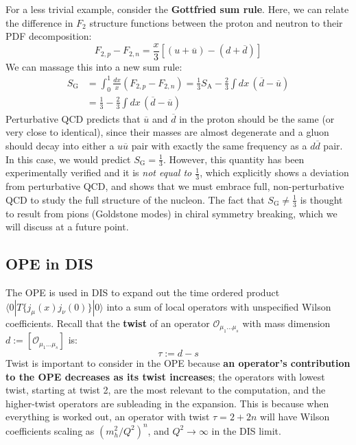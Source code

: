 \documentclass[11pt, oneside]{article}   	%
\theoremstyle{definition}
\begin{document}
For a less trivial example, consider the \textbf{Gottfried sum rule}. Here, we can relate the difference in $F_2$ structure functions between 
the proton and neutron to their PDF decomposition:
\begin{equation}
	F_{2, p} - F_{2, n} = \frac{x}{3}\left[(u + \overline u) - (d + \overline d)\right]
\end{equation}
We can massage this into a new sum rule:
\begin{align}
	S_\mathrm{G} &= \int_0^1\frac{dx}{x}(F_{2, p} - F_{2, n}) = \frac{1}{3} S_\mathrm{A} - \frac{2}{3} \int dx\, (\overline d - \overline u) \\
	&= \frac{1}{3} - \frac{2}{3}\int dx\,(\overline d - \overline u)
\end{align}
Perturbative QCD predicts that $\overline u$ and $\overline d$ in the proton should be the same (or very close to identical), since their 
masses are almost degenerate and a gluon should decay into either a $u\overline u$ pair with exactly the same frequency as a $d\overline d$ 
pair. In this case, we would predict $S_\mathrm{G} = \frac{1}{3}$. However, this quantity has been experimentally verified and it is \textit{not 
equal to $\frac{1}{3}$}, which explicitly shows a deviation from perturbative QCD, and shows that we must embrace full, non-perturbative 
QCD to study the full structure of the nucleon. The fact that $S_\mathrm{G}\neq\frac{1}{3}$ is thought to result from pions (Goldstone 
modes) in chiral symmetry breaking, which we will discuss at a future point.

\subsection{OPE in DIS}

The OPE is used in DIS to expand out the time ordered product $\langle 0 | T\{j_\mu(x) j_\nu(0)\} | 0 \rangle$ into a sum of 
local operators with unspecified Wilson coefficients. Recall that the \textbf{twist} of an operator 
$\mathcal{O}_{\mu_1 ... \mu_s}$ with mass dimension $d := [\mathcal{O}_{\mu_1 ... \mu_s}]$ is:
\begin{equation}
	\tau := d - s
\end{equation}
Twist is important to consider in the OPE because \textbf{an operator's contribution to the OPE decreases as its twist 
increases}; the operators with lowest twist, starting at twist 2, are the most relevant to the computation, and the higher-twist 
operators are subleading in the expansion. This is because when everything is worked out, an operator with twist $\tau = 2 + 
2n$ will have Wilson coefficients scaling as $(m_h^2 / Q^2)^n$, and $Q^2\rightarrow\infty$ in the DIS limit. 
\end{document}
